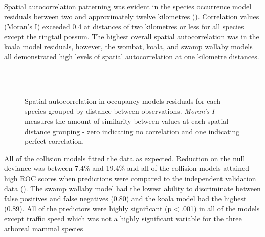 Spatial autocorrelation patterning was evident in the species occurrence model residuals between two and approximately twelve kilometres (). Correlation values (Moran's I) exceeded 0.4 at distances of two kilometres or less for all species except the ringtail possum. The highest overall spatial autocorrelation was in the koala model residuals, however, the wombat, koala, and swamp wallaby models all demonstrated high levels of spatial autocorrelation at one kilometre distances.

\begin{figure*}[!t]
  \centering
  \hspace{0.5cm}
  \\
  \hspace{0.5cm}
  \\
  \hspace{0.5cm}
  \caption[Spatial autocorrelation in occupancy models residuals for six mammal species]{Spatial autocorrelation in occupancy models residuals for each species grouped by distance between observations. \textit{Moran's I} measures the amount of similarity between values at each spatial distance grouping - zero indicating no correlation and one indicating perfect correlation.}
  \label{6sp_sac}
\end{figure*}

All of the collision models fitted the data as expected.  Reduction on the null deviance was between 7.4\% and 19.4\% and all of the collision models attained high ROC scores when predictions were compared to the independent validation data ().  The swamp wallaby model had the lowest ability to discriminate between false positives and false negatives (0.80) and the koala model had the highest (0.89). All of the predictors were highly significant (p$<$.001) in all of the models except traffic speed which was not a highly significant variable for the three arboreal mammal species

